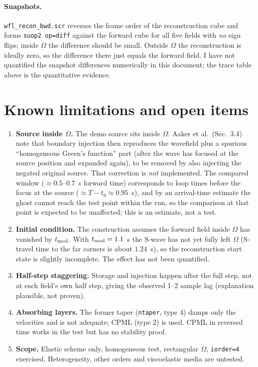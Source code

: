 \documentclass[11pt,a4paper]{article}
\begin{document}
\paragraph{Snapshots.}
\texttt{wfl\_recon\_bwd.scr} reverses the frame order of the reconstruction cube and
forms \texttt{suop2 op=diff} against the forward cube for all five fields with
\emph{no} sign flips; inside $\Omega$ the difference should be small. Outside
$\Omega$ the reconstruction is ideally zero, so the difference there just equals the forward field.
I have not quantified the snapshot differences numerically in this document; the
trace table above is the quantitative evidence.

\section{Known limitations and open items}
\begin{enumerate}[leftmargin=1.4em]
\item \textbf{Source inside $\Omega$.} The demo source sits inside $\Omega$.
  Aaker et al.\ (Sec.~3.4) note that boundary injection then reproduces the
  wavefield plus a spurious ``homogeneous Green's function'' part
  (after the wave has focused at the source position and expanded again), to be
  removed by also injecting the negated original source. That correction is
  \emph{not} implemented. The compared window ($\approx0.5$--$0.7$~s forward time)
  corresponds to loop times before the focus at the source ($\approx T-t_0\approx0.95$~s),
  and by an arrival-time estimate the ghost cannot reach the test point within the
  run, so the comparison at that point is expected to be unaffected; this is an
  estimate, not a test.
\item \textbf{Initial condition.} The construction assumes the forward field inside
  $\Omega$ has vanished by $t_{\rm mod}$. With $t_{\rm mod}=1.1$~s the S-wave has
  not yet fully left $\Omega$ (S-travel time to the far corners is about
  $1.24$~s), so the reconstruction start state is slightly incomplete. The effect
  has not been quantified.
\item \textbf{Half-step staggering.} Storage and injection happen after the full
  step, not at each field's own half step, giving the observed 1--2 sample lag
  (explanation plausible, not proven).
\item \textbf{Absorbing layers.} The former taper (\texttt{ntaper}, type 4) damps only the
  velocities and is not adequate; CPML (type 2) is used. CPML in reversed time
  works in the test but has no stability proof.
\item \textbf{Scope.} Elastic scheme only, homogeneous test, rectangular $\Omega$,
  \texttt{iorder=4} exercised. Heterogeneity, other orders and viscoelastic media
  are untested.
\end{enumerate}
\end{document}
